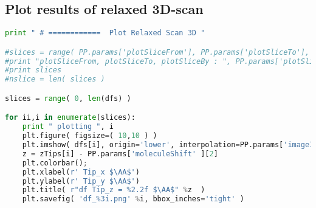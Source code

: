 \subsection{Plot results of relaxed 3D-scan}
\begin{shadedbox}
    \begin{lstlisting}[language=python]
print " # ============  Plot Relaxed Scan 3D "

#slices = range( PP.params['plotSliceFrom'], PP.params['plotSliceTo'], PP.params['plotSliceBy'] )
#print "plotSliceFrom, plotSliceTo, plotSliceBy : ", PP.params['plotSliceFrom'], PP.params['plotSliceTo'], PP.params['plotSliceBy']
#print slices 
#nslice = len( slices )

slices = range( 0, len(dfs) )

for ii,i in enumerate(slices):
    print " plotting ", i
    plt.figure( figsize=( 10,10 ) )
    plt.imshow( dfs[i], origin='lower', interpolation=PP.params['imageInterpolation'], cmap=PP.params['colorscale'], extent=extent )
    z = zTips[i] - PP.params['moleculeShift' ][2]
    plt.colorbar();
    plt.xlabel(r' Tip_x $\AA$')
    plt.ylabel(r' Tip_y $\AA$')
    plt.title( r"df Tip_z = %2.2f $\AA$" %z  )
    plt.savefig( 'df_%3i.png' %i, bbox_inches='tight' )

    \end{lstlisting}
\end{shadedbox}


